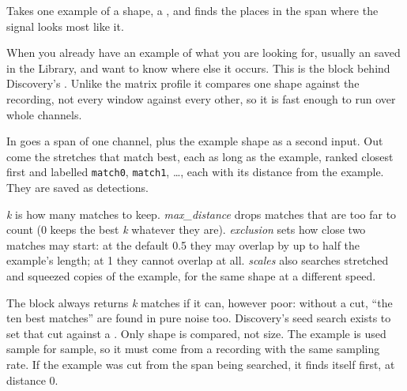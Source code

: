 Takes one example of a shape, a , and finds the places in the span where the
signal looks most like it.

When you already have an example of what you are looking for, usually an
 saved in the Library, and want to know where else it occurs. This is the
block behind Discovery's . Unlike the matrix profile it compares one
shape against the recording, not every window against every other, so it is fast enough to run
over whole channels.

In goes a span of one channel, plus the example shape as a second input. Out come the stretches
that match best, each as long as the example, ranked closest first and labelled
\texttt{match0}, \texttt{match1}, \dots, each with its distance from the example. They are saved as
detections.

\emph{k} is how many matches to keep. \emph{max\_distance} drops matches that are too far to count
(0 keeps the best \emph{k} whatever they are). \emph{exclusion} sets how close two matches may
start: at the default 0.5 they may overlap by up to half the example's length; at 1 they cannot
overlap at all. \emph{scales} also searches stretched and squeezed copies of the example, for the
same shape at a different speed.

The block always returns \emph{k} matches if it can, however poor: without a cut, ``the ten best
matches'' are found in pure noise too. Discovery's seed search exists to set that cut against a
. Only shape is compared, not size. The example is used sample for sample, so it
must come from a recording with the same sampling rate. If the example was cut from the span being
searched, it finds itself first, at distance 0.

